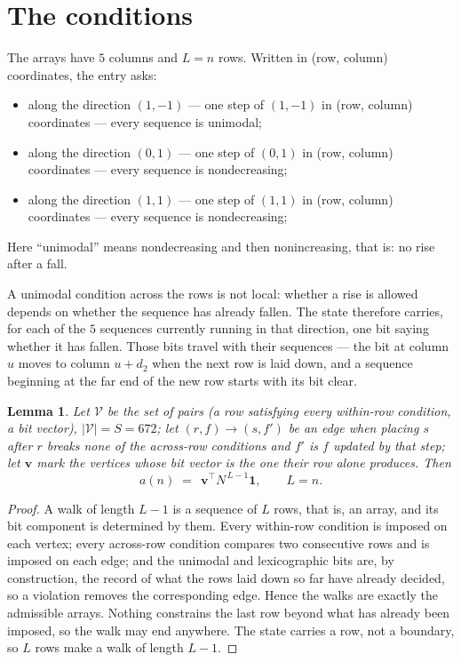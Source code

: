 \documentclass[11pt,a4paper]{article}
\theoremstyle{plain}
\newtheorem{lemma}[theorem]{Lemma}
\theoremstyle{definition}
\begin{document}
\section{The conditions}

The arrays have $5$ columns and $L=n$ rows. Written in (row, column)
coordinates, the entry asks:
\begin{itemize}
\item along the direction $(1,-1)$ --- one step of $(1,-1)$ in (row, column) coordinates --- every sequence is unimodal;
\item along the direction $(0,1)$ --- one step of $(0,1)$ in (row, column) coordinates --- every sequence is nondecreasing;
\item along the direction $(1,1)$ --- one step of $(1,1)$ in (row, column) coordinates --- every sequence is nondecreasing;
\end{itemize}
Here ``unimodal'' means nondecreasing and then nonincreasing, that is: no rise after a fall.

A unimodal condition across the rows is not local: whether a
rise is allowed depends on whether the sequence has already fallen. The state therefore
carries, for each of the $5$ sequences currently running in that direction, one bit saying
whether it has fallen. Those bits travel with their sequences --- the bit at column $u$
moves to column $u+d_2$ when the next row is laid down, and a sequence beginning at the
far end of the new row starts with its bit clear.

\begin{lemma}\label{lem:walk}
Let $\mathcal V$ be the set of pairs (a row satisfying every within-row condition, a
bit vector), $|\mathcal V|=S=672$; let $(r,f)\to(s,f')$ be an edge when placing $s$ after $r$
breaks none of the across-row conditions and $f'$ is $f$ updated by that step; let
$\mathbf{v}$ mark the vertices whose bit vector is the one their row alone produces.
Then
\[
a(n)\;=\;\,\mathbf{v}^{\!\top}N^{\,L-1}\mathbf{1},\qquad L=n.
\]
\end{lemma}

\begin{proof}
A walk of length $L-1$ is a sequence of $L$ rows, that is, an array, and its bit component
is determined by them. Every within-row condition is imposed on each vertex; every
across-row condition compares two consecutive rows and is imposed on each edge; and the
unimodal and lexicographic bits are, by construction, the record of what the rows laid down
so far have already decided, so a violation removes the corresponding edge. Hence the walks
are exactly the admissible arrays. Nothing constrains the last row beyond what has already
been imposed, so the walk may end anywhere. The state carries a row, not a boundary, so
$L$ rows make a walk of length $L-1$.
\end{proof}
\end{document}
